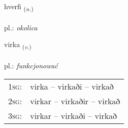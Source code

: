 \documentclass[frontgrid, backgrid]{flacards}\usepackage[]{graphicx}\usepackage[]{xcolor}
\begin{document}
\renewcommand{\blhead}{\vskip5pt {\small\bfseries\footnotesize Nafnorð | Noun }}
\renewcommand{\bcfoot}{\vskip5pt \hspace{2pt}{\small\bfseries\footnotesize 2K}}


{hverfi \small{\textsubscript{(\textit{n.})}} \\[1ex] %
\textphonetic{[kʰvɛrvɪ]} \\
pl.: \emph{okolica} \\  [2ex]
\renewcommand*{\arraystretch}{0.8}
}

\renewcommand{\flhead}{\vskip5pt \fboxsep=0pt {\small\bfseries\footnotesize Sagnorð | Verb}}
\renewcommand{\fcfoot}{\vskip5pt \fboxsep=0pt \hspace{2pt}{\small\bfseries\footnotesize 2K}}

\renewcommand{\blhead}{\vskip5pt {\small\bfseries\footnotesize Sagnorð | Verb }}
\renewcommand{\bcfoot}{\vskip5pt \hspace{2pt}{\small\bfseries\footnotesize 2K}}


{virka \small{\textsubscript{(\textit{v.})}} \\[1ex] %
\textphonetic{[vɪr̥ka]} \\
pl.: \emph{funkcjonować} \\  [2ex]
\renewcommand*{\arraystretch}{0.8}
\begin{tabular}{p{1cm}l}
\textsc{1sg}: & virka -- virkaði -- virkað \\ 
\textsc{2sg}: & virkar -- virkaðir -- virkað \\ 
\textsc{3sg}: & virkar -- virkaði -- virkað \\ 
\end{tabular}
}
\end{document}
